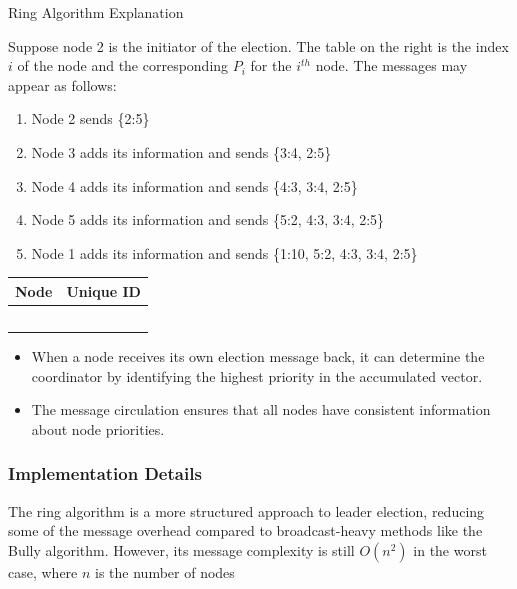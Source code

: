 \begin{example}{Ring Algorithm Explanation}
\begin{minipage}{0.65\textwidth} %
    Suppose node 2 is the initiator of the election. The table on the right is the index $i$ of the node and the corresponding $P_i$ for the $i^{th}$ node. The messages may appear as follows: 
    
    \begin{enumerate}[label=\roman*), noitemsep, topsep=1.5pt]
        \item Node 2 sends \{2:5\}
        \item Node 3 adds its information and sends \{3:4, 2:5\}
        \item Node 4 adds its information and sends \{4:3, 3:4, 2:5\}
        \item Node 5 adds its information and sends \{5:2, 4:3, 3:4, 2:5\}
        \item Node 1 adds its information and sends \{1:10, 5:2, 4:3, 3:4, 2:5\}
    \end{enumerate}
\end{minipage}
\hfill %
\begin{minipage}{0.3\textwidth} %
    \centering
    \begin{tabularx}{\textwidth}{@{} >{\RaggedRight\arraybackslash}X | >{\RaggedRight\arraybackslash}X @{}}
        \toprule
        Node & Unique ID \\
        \midrule
        1 & 10 \\
        2 & 5 \\
        3 & 4 \\
        4 & 3 \\
        5 & 2 \\
        \bottomrule
    \end{tabularx}
    \label{tab:ring-algo-table}
\end{minipage}
\end{example}

\begin{itemize}[itemsep=1pt]
\item When a node receives its own election message back, it can determine the coordinator by identifying the highest priority in the accumulated vector.
\item The message circulation ensures that all nodes have consistent information about node priorities.
\end{itemize}

\subsubsection*{Implementation Details}
The ring algorithm is a more structured approach to leader election, reducing some of the message overhead compared to broadcast-heavy methods like the Bully algorithm. However, its message complexity is still $O(n^2)$ in the worst case, where $n$ is the number of nodes
